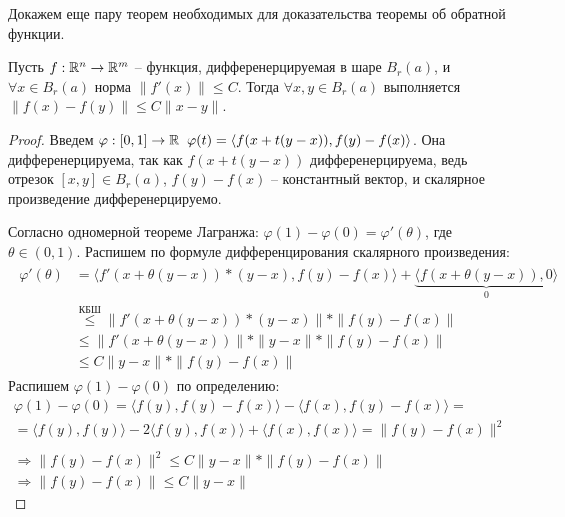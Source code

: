 Докажем еще пару теорем необходимых для доказательства теоремы об обратной функции.
\begin{theorem}
    Пусть $f: \mathbb{R}^n \to \mathbb{R}^m$ -- функция, дифференерцируемая в шаре $B_r(a)$, и $\forall x \in B_r(a)$ норма $\| f'(x) \| \leqslant C$. 
    Тогда $\forall x, y \in B_r(a)$ выполняется $\| f(x) - f(y) \| \leqslant C \| x - y \|$.
\end{theorem}
\begin{proof}
    Введем $\varphi:[0, 1] \to \mathbb{R} \;\; \varphi(t) = \langle f(x + t(y - x)), f(y) - f(x) \rangle$.
    Она дифференерцируема, так как $f(x + t(y - x))$ дифференерцируема, ведь отрезок $[x, y] \in B_r(a)$, $f(y) - f(x)$ -- константный вектор, и скалярное произведение дифференерцируемо.

    \quad Согласно одномерной теореме Лагранжа: $\varphi(1) - \varphi(0) = \varphi'(\theta)$, где $\theta \in (0, 1)$. 
    Распишем по формуле дифференцирования скалярного произведения: \begin{gather*}
        \begin{split}
            \varphi'(\theta) &= \langle f'(x + \theta(y - x))*(y - x), f(y) - f(x) \rangle + \underbrace{\langle f(x + \theta(y - x)), 0 \rangle}_0  \\
            &\overset{\text{КБШ}}{\leqslant} \| f'(x + \theta(y - x))*(y - x) \| * \| f(y) - f(x) \| \\
            &\leqslant \| f'(x + \theta(y - x))\| * \| y - x \| * \| f(y) - f(x) \| \\
            &\leqslant C\| y - x \| * \| f(y) - f(x) \|
        \end{split}
    \end{gather*}
    \quad Распишем $\varphi(1) - \varphi(0)$ по определению: \begin{gather*}
        \varphi(1) - \varphi(0) = \langle f(y), f(y) - f(x) \rangle - \langle f(x), f(y) - f(x) \rangle = \\
        = \langle f(y), f(y) \rangle - 2 \langle f(y), f(x) \rangle +  \langle f(x), f(x) \rangle = \| f(y) - f(x) \|^2 \\ \\
        \Rightarrow \| f(y) - f(x) \|^2 \leqslant C \| y - x \| * \| f(y) - f(x) \| \\
        \Rightarrow \| f(y) - f(x) \| \leqslant C \| y - x \|
    \end{gather*} 
\end{proof}

